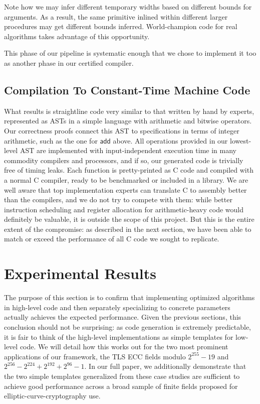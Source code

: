 \documentclass[letterpaper,twocolumn,10pt]{article}
\newcommand{\id}[1]{\bm{\mathsf{#1}}}
\begin{document}
\noindent Note how we may infer different temporary widths based on different bounds for arguments.
As a result, the same primitive inlined within different larger procedures may get different bounds inferred.
World-champion code for real algorithms takes advantage of this opportunity.

This phase of our pipeline is systematic enough that we chose to implement it too as another phase in our certified compiler.

\subsection{Compilation To Constant-Time Machine Code}\label{ex-asm}

What results is straightline code very similar to that written by hand by experts, represented as ASTs in a simple language with arithmetic and bitwise operators.
Our correctness proofs connect this AST to specifications in terms of integer arithmetic, such as the one for $\id{add}$ above.
All operations provided in our lowest-level AST are implemented with input-independent execution time in many commodity compilers and processors, and if so, our generated code is trivially free of timing leaks.
Each function is pretty-printed as C code and compiled with a normal C compiler, ready to be benchmarked or included in a library.
We are well aware that top implementation experts can translate C to assembly better than the compilers, and we do not try to compete with them: while better instruction scheduling and register allocation for arithmetic-heavy code would definitely be valuable, it is outside the scope of this project.
But this is the entire extent of the compromise: as described in the next section, we have been able to match or exceed the performance of all C code we sought to replicate.

\section{Experimental Results}\label{experiments}

The purpose of this section is to confirm that implementing optimized algorithms in high-level code and then separately specializing to concrete parameters actually achieves the expected performance.
Given the previous sections, this conclusion should not be surprising: as code generation is extremely predictable, it is fair to think of the high-level implementations as simple templates for low-level code.
We will detail how this works out for the two most prominent applications of our framework, the TLS ECC fields modulo $2^{255}-19$ and $2^{256}-2^{224}+2^{192}+2^{96}-1$.
In our full paper, we additionally demonstrate that the two simple templates generalized from these case studies are sufficient to achieve good performance across a broad sample of finite fields proposed for elliptic-curve-cryptography use.
\end{document}
